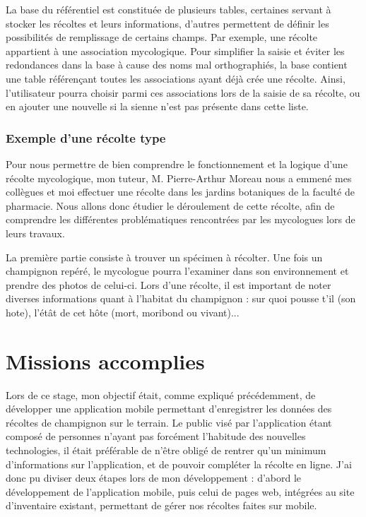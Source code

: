 \documentclass[11pt, a4paper, twoside]{report}
\begin{document}
La base du référentiel est constituée de plusieurs tables, certaines servant à stocker les récoltes et leurs informations, d'autres permettent de définir les possibilités de remplissage de certains champs. Par exemple, une récolte appartient à une association mycologique. Pour simplifier la saisie et éviter les redondances dans la base à cause des noms mal orthographiés, la base contient une table référençant toutes les associations ayant déjà crée une récolte. Ainsi, l'utilisateur pourra choisir parmi ces associations lors de la saisie de sa récolte, ou en ajouter une nouvelle si la sienne n'est pas présente dans cette liste.



\subsection{Exemple d'une récolte type}
Pour nous permettre de bien comprendre le fonctionnement et la logique d'une récolte mycologique, mon tuteur, M. Pierre-Arthur Moreau nous a emmené mes collègues et moi effectuer une récolte dans les jardins botaniques de la faculté de pharmacie. Nous allons donc étudier le déroulement de cette récolte, afin de comprendre les différentes problématiques rencontrées par les mycologues lors de leurs travaux.

La première partie consiste à trouver un spécimen à récolter. Une fois un champignon repéré, le mycologue pourra l'examiner dans son environnement et prendre des photos de celui-ci. Lors d'une récolte, il est important de noter diverses informations quant à l'habitat du champignon : sur quoi pousse t'il (son hote), l'étât de cet hôte (mort, moribond ou vivant)...

\chapter{Missions accomplies}
Lors de ce stage, mon objectif était, comme expliqué précédemment, de développer une application mobile permettant d'enregistrer les données des récoltes de champignon sur le terrain. 
Le public visé par l'application étant composé de personnes n'ayant pas forcément l'habitude des nouvelles technologies, il était préférable de n'être obligé de rentrer qu'un minimum d'informations sur l'application, et de pouvoir compléter la récolte en ligne.
\newline
J'ai donc pu diviser deux étapes lors de mon développement : d'abord le développement de l'application mobile, puis celui de pages web, intégrées au site d'inventaire existant, permettant de gérer nos récoltes faites sur mobile.
\end{document}

